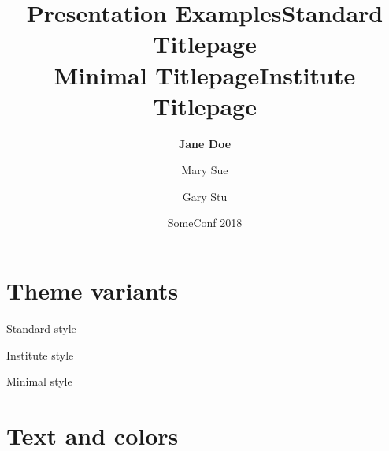 \documentclass[table, aspectratio=169]{beamer}
\title[]{Presentation Examples}
\author[Jane Doe]{\textbf{Jane Doe} \and Mary Sue \and Gary Stu}
\date{SomeConf 2018}
\institute{IAIK}
\begin{document}
\begin{frame}[plain]
  \maketitle
\end{frame}

\begin{frame}
  \tableofcontents
\end{frame}

\section{Theme variants}

\switchtostandard
\title[]{Standard Titlepage\\Minimal Titlepage}
\begin{frame}[plain]
  \maketitle
\end{frame}

\switchtoinstitute
\title[]{Institute Titlepage}
\begin{frame}[plain]
  \maketitle
\end{frame}

\switchtostandard
\begin{frame}{Standard style}
\end{frame}
\switchtoinstitute
\begin{frame}{Institute style}
\end{frame}
\switchtominimal
\begin{frame}{Minimal style}
\end{frame}
\switchtostandard

\section{Text and colors}
\end{document}
